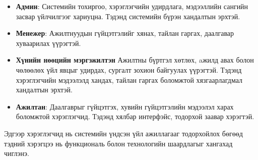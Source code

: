 
\begin{itemize}
    \item \textbf{Админ}: Системийн тохиргоо, хэрэглэгчийн удирдлага, мэдээллийн 
    сангийн засвар үйлчилгээг хариуцна. Тэдэнд системийн бүрэн хандалтын эрхтэй.
    \item \textbf{Менежер}: Ажилтнуудын гүйцэтгэлийг хянах, тайлан гаргах, даалгавар 
    хуваарилах үүрэгтэй.
    \item \textbf{Хүнийн нөөцийн мэргэжилтэн} Ажилтны бүртгэл хөтлөх, aжилд авах болон чөлөөлөх 
    үйл явцыг удирдах, сургалт зохион байгуулах үүрэгтэй. Тэдэнд хэрэглэгчийн мэдээлэлд хандах, 
    тайлан гаргах боломжтой хязгаарлагдмал хандалтын эрхтэй.
    \item \textbf{Ажилтан}: Даалгаврыг гүйцэтгэх, хувийн гүйцэтгэлийн мэдээлэл харах 
    боломжтой хэрэглэгчид. Тэдэнд хялбар интерфэйс, тодорхой заавар хэрэгтэй.
\end{itemize}
Эдгээр хэрэглэгчид нь системийн үндсэн үйл ажиллагааг тодорхойлох бөгөөд тэдний хэрэгцээ нь функциональ болон технологийн шаардлагыг хангахад чиглэнэ.